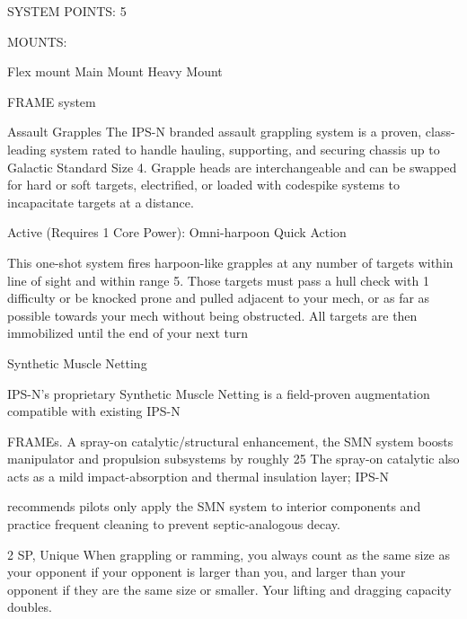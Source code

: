                                                SYSTEM POINTS: 5 

                                                     MOUNTS: 

  Flex mount                          Main Mount                             Heavy Mount 

                                                  FRAME system 

                                                                                                                


                                                   Assault Grapples  
   The IPS-N branded assault grappling system is a proven, class-leading system rated to handle hauling,  
  supporting, and securing chassis up to Galactic Standard Size 4. Grapple heads are interchangeable  
  and can be swapped for hard or soft targets, electrified, or loaded with codespike systems to  
  incapacitate targets at a distance. 
 

  Active (Requires 1 Core Power): Omni-harpoon  
   Quick Action
 
  This one-shot system fires harpoon-like grapples at any number of targets within line of sight and within  
   range 5. Those targets must pass a hull check with 1 difficulty or be knocked prone and pulled adjacent  
  to your mech, or as far as possible towards your mech without being obstructed. All targets are then  
   immobilized until the end of your next turn 

Synthetic Muscle Netting  

IPS-N’s proprietary Synthetic Muscle Netting is a field-proven augmentation compatible with existing IPS-N  

FRAMEs. A spray-on catalytic/structural enhancement, the SMN system boosts manipulator and  
propulsion subsystems by roughly 25%
The spray-on catalytic also acts as a mild impact-absorption and thermal insulation layer; IPS-N  

recommends pilots only apply the SMN system to interior components and practice frequent cleaning to  
prevent septic-analogous decay.    

2 SP, Unique  
When grappling or ramming, you always count as the same size as your opponent if your  
opponent is larger than you, and larger than your opponent if they are the same size or smaller.  
Your lifting and dragging capacity doubles.
 

